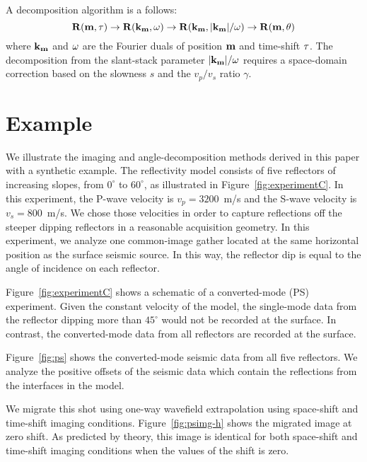 A decomposition algorithm is a follows:
\[
\RR(\mm,\tt) \rightarrow
\RR(\kmv,\w) \rightarrow
\RR(\kmv,\mkm/\w) \rightarrow
\RR(\mm,\theta)
\]
where $\kmv$ and $\w$ are the Fourier duals of 
position $\mm$ and time-shift $\tt$.
The decomposition
from the slant-stack parameter $\mkm/\w$ requires a 
space-domain correction based on the 
slowness $s$ and the $v_p/v_s$ ratio $\gamma$.

\section{Example}

We illustrate the imaging and angle-decomposition methods derived
in this paper with a synthetic example.
The reflectivity model consists of five reflectors of increasing
slopes, from $0^\circ$ to $60^\circ$, as illustrated in 
Figure~\ref{fig:experimentC}.
In this experiment, 
the P-wave velocity is $v_p=3200$~m/s and 
the S-wave velocity is $v_s=800$~m/s. 
We chose those velocities in order to capture reflections off the 
steeper dipping reflectors in a reasonable acquisition geometry.
In this experiment, we analyze one common-image gather located
at the same horizontal position as the surface seismic source.
In this way, the reflector dip is equal to the angle of incidence
on each reflector.

Figure~\ref{fig:experimentC} shows a schematic of a converted-mode (PS)
experiment. Given the constant velocity of the model, 
the single-mode data from the reflector dipping more than $45^\circ$ 
would not be recorded at the surface.
In contrast, the converted-mode data from all reflectors
are recorded at the surface.


Figure~\ref{fig:ps} shows the converted-mode seismic data from all
five reflectors. We analyze the positive offsets of the seismic data
which contain the reflections from the interfaces in the model.

We migrate this shot using one-way wavefield extrapolation using 
space-shift and time-shift imaging conditions.
Figure~\ref{fig:psimg-h} shows the migrated image at
zero shift.
As predicted by theory, this image is identical 
for both space-shift and time-shift imaging conditions when the 
values of the shift is zero.

